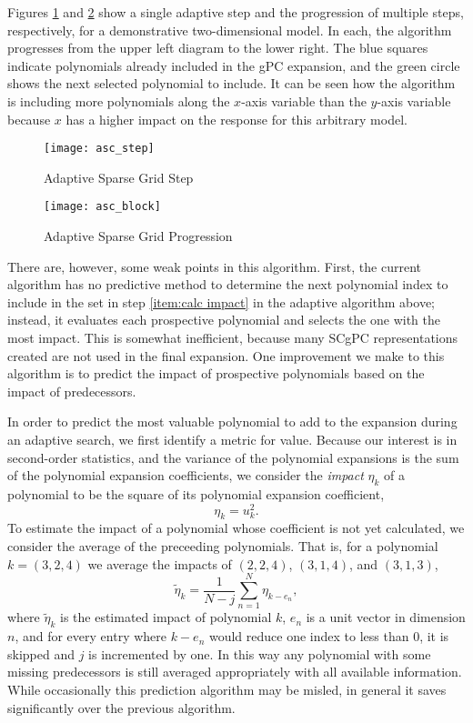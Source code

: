 Figures \ref{fig:asg step} and \ref{fig:asg block} show a single adaptive
step and the progression of multiple steps, respectively, for a demonstrative two-dimensional model.  In each, 
the algorithm progresses from the upper
left diagram to the lower right.  The blue squares indicate polynomials already included in the gPC expansion, and the green circle
shows the next selected polynomial to include.  It can be seen how the algorithm is including more polynomials
along the $x$-axis variable than the $y$-axis variable because $x$ has a higher impact on the response for
this arbitrary model.
\begin{figure}[H]
  \centering
  \texttt{[image: asc\_step]}
  \caption{Adaptive Sparse Grid Step}
  \label{fig:asg step}
\end{figure}
\begin{figure}[H]
  \centering
  \texttt{[image: asc\_block]}
  \caption{Adaptive Sparse Grid Progression}
  \label{fig:asg block}
\end{figure}

There are, however, some weak points in this algorithm.  First, the current algorithm has no predictive method
to determine the next polynomial index to include in the set in step \ref{item:calc impact} in the adaptive
algorithm above; instead, it evaluates each prospective polynomial and
selects the one with the most impact.  This is somewhat inefficient, because many SCgPC representations created
are not used in the final expansion.  One improvement we make to this algorithm is to predict the impact of
prospective polynomials based on the impact of predecessors.

In order to predict the most valuable polynomial to add to the expansion during an adaptive search, we first
identify a metric for value.  Because our interest is in second-order statistics, and the variance of the
polynomial expansions is the sum of the polynomial expansion coefficients, we consider the \emph{impact}
$\eta_k$ of a polynomial to be the square of its polynomial expansion coefficient,
\begin{equation}\label{eq: act poly impact}
  \eta_k = u_k^2.
\end{equation}
To estimate the impact of a polynomial whose coefficient is not yet calculated, we consider the average of the
preceeding polynomials.  That is, for a polynomial $k=(3,2,4)$ we average the impacts of $(2,2,4)$, $(3,1,4)$,
and $(3,1,3)$,
\begin{equation}\label{eq: poly impact}
  \tilde \eta_k = \frac{1}{N-j}\sum_{n=1}^N \eta_{k-e_n},
\end{equation}
where $\tilde \eta_k$ is the estimated impact of polynomial $k$, $e_n$ is a unit vector in dimension $n$, and
for every entry where $k-e_n$ would reduce one index to less than 0, it is skipped and $j$ is incremented by
one.  In this way any polynomial with some missing predecessors is still averaged appropriately with all
available information.  While occasionally this prediction algorithm may be misled, in general it saves
significantly over the previous algorithm.

